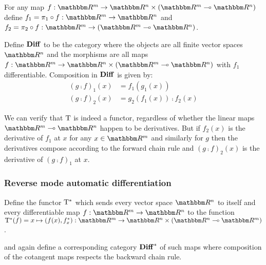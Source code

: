 For any map $f: \RR^m \to \RR^n \times (\RR^m \linearto \RR^n)$ define $f_1 = \pi_1 \comp f: \RR^m \to \RR^n$
and $f_2 = \pi_2 \comp f: \RR^m \to (\RR^m \linearto \RR^n)$.

\begin{definition}[$\Diff$]
\label{def:auto-diff:Diff}
Define $\Diff$ to be the category where the objects are all finite vector spaces $\RR^n$ and the morphisms
are all maps $f: \RR^m \to \RR^n \times (\RR^m \linearto \RR^n)$ with $f_1$ differentiable. Composition in
$\Diff$ is given by:
\begin{align*}
(g \comp f)_1(x) &= f_1(g_1(x)) \\
(g \comp f)_2(x) &= g_2(f_1(x)) \comp f_2(x)
\end{align*}
\end{definition}

We can verify that $\mathrm{T}$ is indeed a functor, regardless of whether the linear maps $\RR^m \linearto
\RR^n$ happen to be derivatives. But if $f_2(x)$ is the derivative of $f_1$ at $x$ for any $x \in \RR^m$ and
similarly for $g$ then the derivatives compose according to the forward chain rule and $(g \comp f)_2(x)$ is
the derivative of $(g \comp f)_1$ at $x$.

\subsubsection{Reverse mode automatic differentiation}

\begin{definition}
Define the functor $\mathrm{T}^*$ which sends every vector space $\RR^n$ to itself and every differentiable map
$f: \RR^m \to \RR^n$ to the function $\cotangents(f) = x \mapsto (f(x), \pullf{f}_x): \RR^m \to \RR^n \times
(\RR^n \linearto \RR^m)$.
\end{definition}

\noindent and again define a corresponding category $\mathbf{Diff}^*$ of such maps where composition of the cotangent
maps respects the backward chain rule. 
